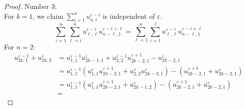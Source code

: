 \documentclass{amsart}
\numberwithin{theorem}{section}
\begin{document}
  \begin{proof}
    Number 3:\\
    For $k=1$, we claim $\sum\limits_{i=1}^{n} u_{n,i}^{\varepsilon-i}$ is independent of $\varepsilon$.
    \[ \sum\limits_{i=1}^{n} \sum\limits_{\ell=i}^n u_{\ell,\ell}^{\varepsilon-i} u_{n-\ell,1}^{\varepsilon-i+\ell} = \sum\limits_{\ell=1}^n \sum\limits_{i=1}^{\ell} u_{\ell,\ell}^{\varepsilon-i} u_{n-\ell,1}^{\varepsilon-i+\ell}\]
    For $n=2$:\\
    \begin{align*}
      u_{2k,1}^{\varepsilon-1}+u_{2k,2}^{\varepsilon}
      &=
      u_{1,1}^{\varepsilon-1}u_{2k-1,1}^{\varepsilon}+u_{2,2}^{\varepsilon-1}u_{2k-2,1}^{\varepsilon+1}-u_{2k-2,1}^{\varepsilon}\\
      &=
      u_{1,1}^{\varepsilon-1}(u_{1,1}^\varepsilon u_{2k-2,1}^{\varepsilon+1}+u_{2,2}^\varepsilon u_{2k-3,1}^{\varepsilon}) - ( u_{2k-2,1}^{\varepsilon+1} + u_{2k-2,1}^{\varepsilon})\\
      &=
      u_{1,1}^{\varepsilon-1}(u_{1,1}^\varepsilon u_{2k-2,1}^{\varepsilon+1}+u_{2k-1,2}^{\varepsilon}) - ( u_{2k-2,1}^{\varepsilon+1} + u_{2k-2,1}^{\varepsilon})\\
      &=
    \end{align*}
  \end{proof}
\end{document}
